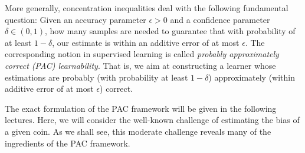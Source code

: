 More generally, concentration inequalities deal with the following fundamental
question: Given an accuracy parameter $\epsilon > 0$ and a confidence
parameter $\delta \in (0,1)$, how many samples are needed to guarantee that with probability of at least $1- \delta$, our estimate is within an additive error of at most $\epsilon$. The corresponding notion in supervised learning is called \emph{probably approximately correct (PAC)
learnability}. That is, we aim at constructing a learner whose
estimations are probably (with probability at least $1-\delta$)
approximately (within additive error of at most $\epsilon$) correct.

The exact formulation of the PAC framework will be given in the following lectures. Here, we will consider the well-known challenge of estimating the bias of a given coin. As we shall see, this moderate challenge reveals many of the ingredients of the PAC framework.

